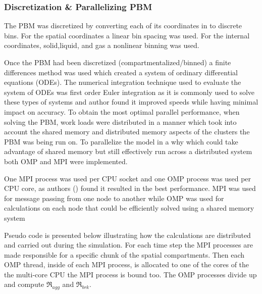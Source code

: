 \documentclass[preprint,11pt,authoryear]{elsarticle}
\begin{document}
	    \subsubsection{Discretization \& Parallelizing PBM}
	    \par The PBM was discretized by converting each of its coordinates in to discrete bins. For the spatial coordinates a linear bin spacing was used. For the internal coordinates, solid,liquid, and gas a nonlinear binning was used. %
	    \par Once the PBM had been discretized (compartmentalized/binned) a finite differences method was used which created a system of ordinary differential equations (ODEs). The numerical integration technique used to evaluate the system of ODEs was first order Euler integration as it is commonly used to solve these types of systems and author  found it improved speeds while having minimal impact on accuracy. To obtain the most optimal parallel performance, when solving the PBM, work loads were distributed in a manner which took into account the shared memory and distributed memory aspects of the clusters the PBM was being run on. To parallelize the model in a why which could take advantage of shared memory but still effectively run across a distributed system both OMP and MPI were implemented. 
	    \par One MPI process was used per CPU socket and one OMP process was used per CPU core, as authors (\cite{Bettencourt2017}) found it resulted in the best performance. MPI was used for message passing from one node to another while OMP was used for calculations on each node that could be efficiently solved using a shared memory system %
	    \par Pseudo code is presented below illustrating how the calculations are distributed and carried out during the simulation. For each time step the MPI processes are made responsible for a specific chunk of the spatial compartments. Then each OMP thread, inside of each MPI process, is allocated to one of the cores of the the multi-core CPU the MPI process is bound too. The OMP processes divide up and compute $\Re_{agg}$ and $\Re_{brk}$. %
\end{document}
